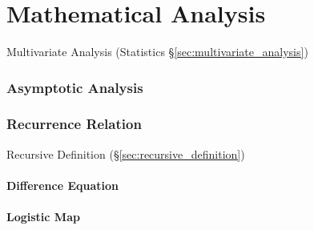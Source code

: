 \part{Mathematical Analysis}\label{part:mathematical_analysis}

\fist Multivariate Analysis (Statistics
\S\ref{sec:multivariate_analysis})



\section{Asymptotic Analysis}\label{sec:asymptotic_analysis}




\section{Recurrence Relation}\label{sec:recurrence_relation}

Recursive Definition (\S\ref{sec:recursive_definition})



\subsection{Difference Equation}\label{sec:difference_equation}

\subsection{Logistic Map}\label{sec:logistic_map}



